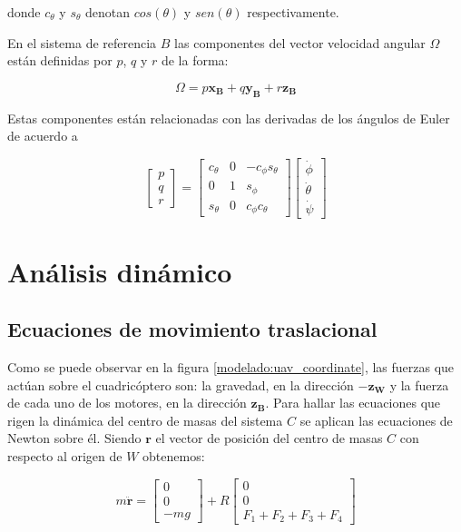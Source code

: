 donde $c_{\theta}$ y $s_{\theta}$ denotan $cos(\theta)$ y $sen(\theta)$ respectivamente.

En el sistema de referencia $B$ las componentes del vector velocidad angular $\Omega$ están definidas por $p$, $q$ y $r$ de la forma: 

\begin{equation}
	\Omega = p \mathbf{x_B} + q \mathbf{y_B} + r \mathbf{z_B}
\end{equation}

Estas componentes están relacionadas con las derivadas de los ángulos de Euler de acuerdo a

\begin{equation}
	\begin{bmatrix}
		p\\
		q\\
		r
	\end{bmatrix}  = \begin{bmatrix}
	c_{\theta}&0& -c_{\phi} s_{\theta}\\
	0 & 1 & s_{\phi}\\
	s_{\theta}&0 & c_{\phi} c_{\theta}
\end{bmatrix}\begin{bmatrix}
\dot{\phi}\\
\dot{\theta}\\
\dot{\psi}
\end{bmatrix} 
\end{equation}

\section{Análisis dinámico}
\subsection{Ecuaciones de movimiento traslacional}
Como se puede observar en la figura \ref{modelado:uav_coordinate}, las fuerzas que actúan sobre el cuadricóptero son: la gravedad, en la dirección $-\mathbf{z_W}$ y la fuerza de cada uno de los motores, en la dirección $\mathbf{z_B}$. Para hallar las ecuaciones que rigen la dinámica del centro de masas del sistema $C$ se aplican las ecuaciones de Newton sobre él. Siendo $\mathbf{r}$ el vector de posición del centro de masas $C$ con respecto al origen de $W$ obtenemos:

\begin{equation}
	\label{analisis:eq1}
	m \mathbf{\ddot{r}} = \begin{bmatrix}
		0\\
		0\\
		-mg
	\end{bmatrix} + R \begin{bmatrix}
	0\\
	0\\
	F_1+F_2 + F_3 + F_4
\end{bmatrix}
\end{equation}

